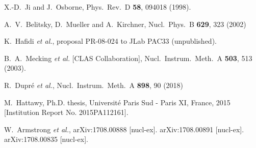 \documentclass[twocolumn,nofootinbib,showpacs,prl,superscriptaddress,secnumarabic,amssymb,nobibnotes,aps,floatfix]{revtex4}
\begin{document}
\begin{thebibliography}{99}
   X.-D.~Ji and J.~Osborne, Phys.\ Rev.\ D {\bf 58}, 094018 (1998).

A.~V.~Belitsky, D.~Mueller and A.~Kirchner,
Nucl.\ Phys.\ B {\bf 629}, 323 (2002)


 K.~Hafidi {\it et al.},
   proposal PR-08-024 to JLab PAC33 (unpublished).

 B.~A.~Mecking {\it et al.} [CLAS Collaboration],
   Nucl.\ Instrum.\ Meth.\ A {\bf 503}, 513 (2003).

  R.~Dupr\'e {\it et al.},
  Nucl.\ Instrum.\ Meth.\ A {\bf 898}, 90 (2018)

M.~Hattawy, Ph.D. thesis, Universit{\'e} Paris Sud - Paris XI, France, 2015 
[Institution Report No. 2015PA112161].

 W.~Armstrong {\it et al.},
     arXiv:1708.00888 [nucl-ex].
       arXiv:1708.00891 [nucl-ex].
         arXiv:1708.00835 [nucl-ex].





\end{thebibliography}
\end{document}
